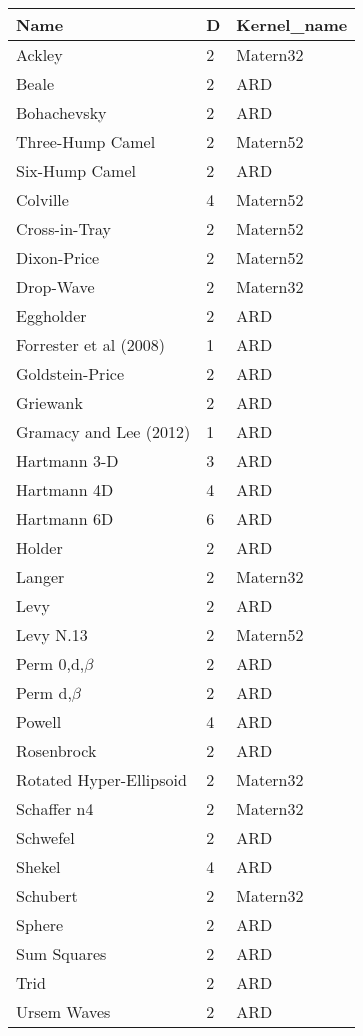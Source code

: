 \begin{tabular}{lll}
Name & D & Kernel_name \\ 
\hline 
Ackley                  & 2 & Matern32 \\ 
Beale                   & 2 & ARD      \\ 
Bohachevsky             & 2 & ARD      \\ 
Three-Hump Camel        & 2 & Matern52 \\ 
Six-Hump Camel          & 2 & ARD      \\ 
Colville                & 4 & Matern52 \\ 
Cross-in-Tray           & 2 & Matern52 \\ 
Dixon-Price             & 2 & Matern52 \\ 
Drop-Wave               & 2 & Matern32 \\ 
Eggholder               & 2 & ARD      \\ 
Forrester et al (2008)  & 1 & ARD      \\ 
Goldstein-Price         & 2 & ARD      \\ 
Griewank                & 2 & ARD      \\ 
Gramacy and Lee (2012)  & 1 & ARD      \\ 
Hartmann 3-D            & 3 & ARD      \\ 
Hartmann 4D             & 4 & ARD      \\ 
Hartmann 6D             & 6 & ARD      \\ 
Holder                  & 2 & ARD      \\ 
Langer                  & 2 & Matern32 \\ 
Levy                    & 2 & ARD      \\ 
Levy N.13               & 2 & Matern52 \\ 
Perm 0,d,$\beta$        & 2 & ARD      \\ 
Perm d,$\beta$          & 2 & ARD      \\ 
Powell                  & 4 & ARD      \\ 
Rosenbrock              & 2 & ARD      \\ 
Rotated Hyper-Ellipsoid & 2 & Matern32 \\ 
Schaffer n4             & 2 & Matern32 \\ 
Schwefel                & 2 & ARD      \\ 
Shekel                  & 4 & ARD      \\ 
Schubert                & 2 & Matern32 \\ 
Sphere                  & 2 & ARD      \\ 
Sum Squares             & 2 & ARD      \\ 
Trid                    & 2 & ARD      \\ 
Ursem Waves             & 2 & ARD      \\ 
\hline 
\end{tabular}
